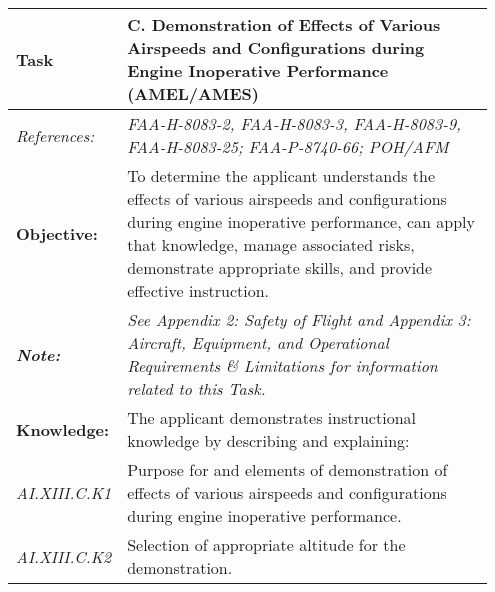 \begin{table}[]
\begin{tabular}%
  {>{\raggedleft\arraybackslash}p{0.15\linewidth}%
   >{\raggedright\arraybackslash}p{0.8\linewidth}%
  }
\textbf{Task}                                                       & \textbf{C. Demonstration of Effects of Various Airspeeds and Configurations during Engine Inoperative Performance (AMEL/AMES)}                                                                                                                      \\ \hline
\textit{References:}                                                & \textit{FAA-H-8083-2, FAA-H-8083-3, FAA-H-8083-9, FAA-H-8083-25; FAA-P-8740-66; POH/AFM}                                                                                                                                                                \\
\textbf{Objective:}                                                 & To determine the applicant understands the effects of various airspeeds and configurations during engine inoperative performance, can apply that knowledge, manage associated risks, demonstrate appropriate skills, and provide effective instruction. \\
\textit{\textbf{Note:}}                                             & \textit{See Appendix 2: Safety of Flight and Appendix 3: Aircraft, Equipment, and Operational Requirements \& Limitations for information related to this Task.}                                                                                        \\ \hline
\textbf{Knowledge:}                                                 & The applicant demonstrates instructional knowledge by describing and explaining:                                                                                                                                                                        \\
\textit{AI.XIII.C.K1}                                               & Purpose for and elements of demonstration of effects of various airspeeds and configurations during engine inoperative performance.                                                                                                                     \\
\textit{AI.XIII.C.K2}                                               & Selection of appropriate altitude for the demonstration.                                                                                                                                                                                                \\

\end{tabular}
\end{table}
